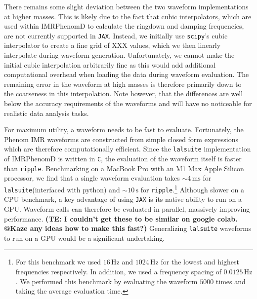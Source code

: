 \documentclass[twocolumn]{aastex631}
\newcommand{\jax}{\texttt{JAX}\xspace}
\newcommand{\ripple}{\texttt{ripple}\xspace}
\newcommand{\lalsuite}{\texttt{lalsuite}\xspace}
\newcommand{\te}[1]{\textbf{\color{pyGreen}(TE: #1)}}
\begin{document}
There remains some slight deviation between the two waveform implementations at higher masses. 
This is likely due to the fact that cubic interpolators, which are used within IMRPhenomD to calculate the ringdown and damping frequencies, are not currently supported in \jax.
Instead, we initially use \texttt{scipy}'s cubic interpolator to create a fine grid of XXX values, which we then linearly interpolate during waveform generation.
Unfortunately, we cannot make the initial cubic interpolation arbitrarily fine as this would add additional computational overhead when loading the data during waveform evaluation.
The remaining error in the waveform at high masses is therefore primarily down to the coarseness in this interpolation.
Note however, that the differences are well below the accuracy requirements of the waveforms and will have no noticeable for realistic data analysis tasks.

For maximum utility, a waveform needs to be fast to evaluate.
Fortunately, the Phenom IMR waveforms are constructed from simple closed form expressions which are therefore computationally efficient.
Since the \lalsuite implementation of IMRPhenomD is written in \texttt{C}, the evaluation of the waveform itself is faster than \ripple.
Benchmarking on a MacBook Pro with an M1 Max Apple Silicon processor, we find that a single waveform evaluation takes $\sim 4\,\mathrm{ms}$ for \lalsuite (interfaced with python) and $\sim 10\,\mathrm{s}$ for \ripple.\footnote{
    For this benchmark we used $16\,\mathrm{Hz}$ and $1024\,\mathrm{Hz}$ for the lowest and highest frequencies respectively. 
    In addition, we used a frequency spacing of $0.0125\,\mathrm{Hz}$. 
    We performed this benchmark by evaluating the waveform $5000$ times and taking the average evaluation time.
}
Although slower on a CPU benchmark, a key advantage of using \jax is its native ability to run on a GPU.
Waveform calls can therefore be evaluated in parallel, massively improving performance. \te{I couldn't get these to be similar on google colab. @Kaze any ideas how to make this fast?}
Generalizing \lalsuite waveforms to run on a GPU would be a significant undertaking.
\end{document}
